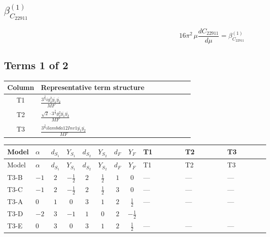 \documentclass[8pt]{article}
\begin{document}
\begin{landscape}
\section*{$\beta_{C_{22911}}^{(1)}$}
\[16\pi^2\,\mu\frac{d C_{22911}}{d\mu}=\beta_{C_{22911}}^{(1)}\]
\subsection*{Terms 1 of 2}
\begin{center}
\begin{tabular}{@{}c >{\raggedright\arraybackslash}p{0.82\linewidth}@{}}
\toprule
Column & Representative term structure \\
\midrule
T1 & \(\displaystyle \frac{3^{\frac{3}{4}} i g_{2}^{2} \overline{y_{1}} \overline{y_{2}}}{MF}\) \\
\midrule
T2 & \(\displaystyle \frac{\sqrt{2} \cdot 3^{\frac{3}{4}} g_{2}^{2} \overline{y_{1}} \overline{y_{2}}}{MF}\) \\
\midrule
T3 & \(\displaystyle \frac{3^{\frac{3}{4}} i lambda12Inv1 \overline{y_{1}} \overline{y_{2}}}{MF}\) \\
\midrule
\bottomrule
\end{tabular}
\end{center}
\smallskip
\tiny
\begin{longtable}{@{}llcccccc >{\raggedright\arraybackslash}p{0.21\linewidth} >{\raggedright\arraybackslash}p{0.21\linewidth} >{\raggedright\arraybackslash}p{0.21\linewidth}@{}}
\toprule
Model & $\alpha$ & $d_{S_1}$ & $Y_{S_1}$ & $d_{S_2}$ & $Y_{S_2}$ & $d_F$ & $Y_F$ & T1 & T2 & T3 \\
\midrule
\endfirsthead
\toprule
Model & $\alpha$ & $d_{S_1}$ & $Y_{S_1}$ & $d_{S_2}$ & $Y_{S_2}$ & $d_F$ & $Y_F$ & T1 & T2 & T3 \\
\midrule
\endhead
T3-B & $-1$ & $2$ & $-\frac{1}{2}$ & $2$ & $\frac{1}{2}$ & $1$ & $0$ & --- & --- & --- \\
\midrule
T3-C & $-1$ & $2$ & $-\frac{1}{2}$ & $2$ & $\frac{1}{2}$ & $3$ & $0$ & --- & --- & --- \\
\midrule
T3-A & $0$ & $1$ & $0$ & $3$ & $1$ & $2$ & $\frac{1}{2}$ & --- & --- & --- \\
\midrule
T3-D & $-2$ & $3$ & $-1$ & $1$ & $0$ & $2$ & $-\frac{1}{2}$ & \scriptsize\adjustbox{max width=\linewidth}{$\begin{gathered} - \frac{17 \cdot 3^{\frac{3}{4}} i g_{2}^{2} \overline{y_{1}} \overline{y_{2}}}{24 MF}\end{gathered}$} & \scriptsize\adjustbox{max width=\linewidth}{$\begin{gathered} - \frac{\sqrt{2} \cdot 3^{\frac{3}{4}} g_{2}^{2} \overline{y_{1}} \overline{y_{2}}}{3 MF}\end{gathered}$} & \scriptsize\adjustbox{max width=\linewidth}{$\begin{gathered} - \frac{3^{\frac{3}{4}} i lambda12Inv1 \overline{y_{1}} \overline{y_{2}}}{6 MF}\end{gathered}$} \\
\midrule
T3-E & $0$ & $3$ & $0$ & $3$ & $1$ & $2$ & $\frac{1}{2}$ & --- & --- & --- \\
\midrule
\bottomrule
\end{longtable}
\clearpage

\end{landscape}
\end{document}
